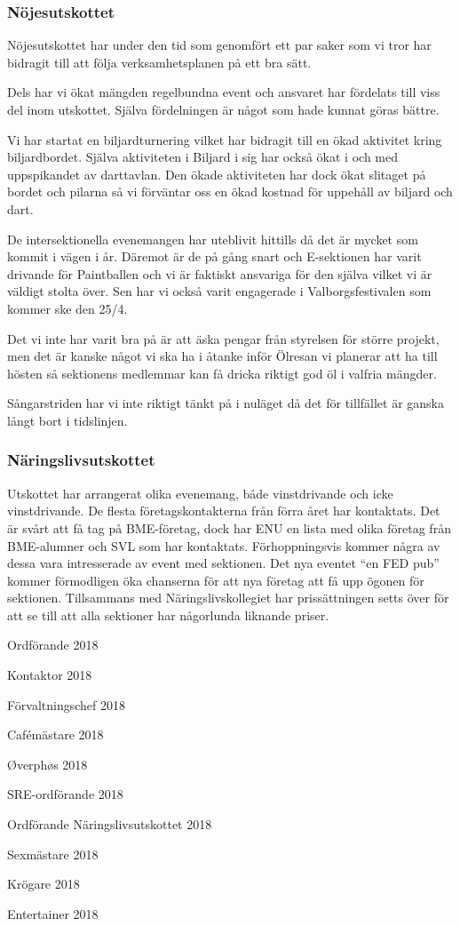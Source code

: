 \documentclass[../_main/handlingar.tex]{subfiles}
\begin{document}
\subsubsection*{Nöjesutskottet}
Nöjesutskottet har under den tid som genomfört ett par saker som vi tror har bidragit till att följa verksamhetsplanen på ett bra sätt.
\begin{dashlist}
    \item Dels har vi ökat mängden regelbundna event och ansvaret har fördelats till viss del inom utskottet. Själva fördelningen är något som hade kunnat göras bättre.
    \item Vi har startat en biljardturnering vilket har bidragit till en ökad aktivitet kring biljardbordet. Själva aktiviteten i Biljard i sig har också ökat i och med uppspikandet av darttavlan. Den ökade aktiviteten har dock ökat slitaget på bordet och pilarna så vi förväntar oss en ökad kostnad för uppehåll av biljard och dart.
    \item De intersektionella evenemangen har uteblivit hittills då det är mycket som kommit i vägen i år. Däremot är de på gång snart och E-sektionen har varit drivande för Paintballen och vi är faktiskt ansvariga för den själva vilket vi är väldigt stolta över. Sen har vi också varit engagerade i Valborgsfestivalen som kommer ske den 25/4. 
\end{dashlist}

Det vi inte har varit bra på är att äska pengar från styrelsen för större projekt, men det är kanske något vi ska ha i åtanke inför Ölresan vi planerar att ha till hösten så sektionens medlemmar kan få dricka riktigt god öl i valfria mängder. 

Sångarstriden har vi inte riktigt tänkt på i nuläget då det för tillfället är ganska långt bort i tidslinjen. 

\subsubsection*{Näringslivsutskottet}
Utskottet har arrangerat olika evenemang, både vinstdrivande och icke vinstdrivande. De flesta företagskontakterna från förra året har kontaktats. Det är svårt att få tag på BME-företag, dock har ENU en lista med olika företag från BME-alumner och SVL som har kontaktats. Förhoppningsvis kommer några av dessa vara intresserade av event med sektionen. Det nya eventet “en FED pub” kommer förmodligen öka chanserna för att nya företag att få upp ögonen för sektionen.
Tillsammans med Näringslivskollegiet har prissättningen setts över för att se till att alla sektioner har någorlunda liknande priser.

\newpage
\begin{signatures}{10}
    \mvh
    \signature{Daniel Bakic}{Ordförande 2018}
    \signature{Axel Voss}{Kontaktor 2018}
    \signature{Magnus Lundh}{Förvaltningschef 2018}
    \signature{Elin Johansson}{Cafémästare 2018}
    \signature{Andreas Bennström}{Øverphøs 2018}
    \signature{Fanny Månefjord}{SRE-ordförande 2018}
    \signature{Isabella Hansen}{Ordförande Näringslivsutskottet 2018}
    \signature{Alexander Wik}{Sexmästare 2018}
    \signature{Malin Heyden}{Krögare 2018}
    \signature{Adam Belfrage}{Entertainer 2018}
\end{signatures}
\end{document}
